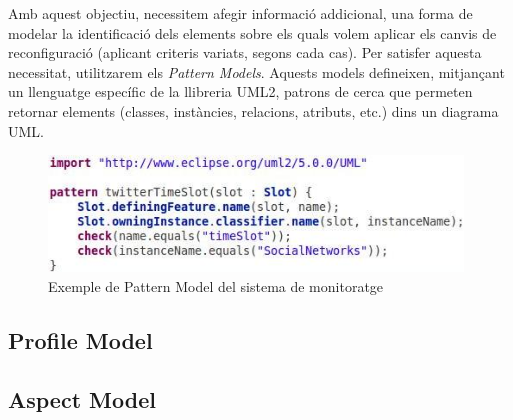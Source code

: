 Amb aquest objectiu, necessitem afegir informació addicional, una forma de modelar la identificació dels elements sobre els quals volem aplicar els canvis de reconfiguració (aplicant criteris variats, segons cada cas). Per satisfer aquesta necessitat, utilitzarem els \textit{Pattern Models}. Aquests models defineixen, mitjançant un llenguatge específic de la llibreria UML2, patrons de cerca que permeten retornar elements (classes, instàncies, relacions, atributs, etc.) dins un diagrama UML. 

\begin{figure}
\centering
\includegraphics[width=11cm]{Figures/Figure19}
\decoRule
\caption{Exemple de Pattern Model del sistema de monitoratge}
\label{fig:Figura19}
\end{figure}



\subsection{Profile Model}

\subsection{Aspect Model}

